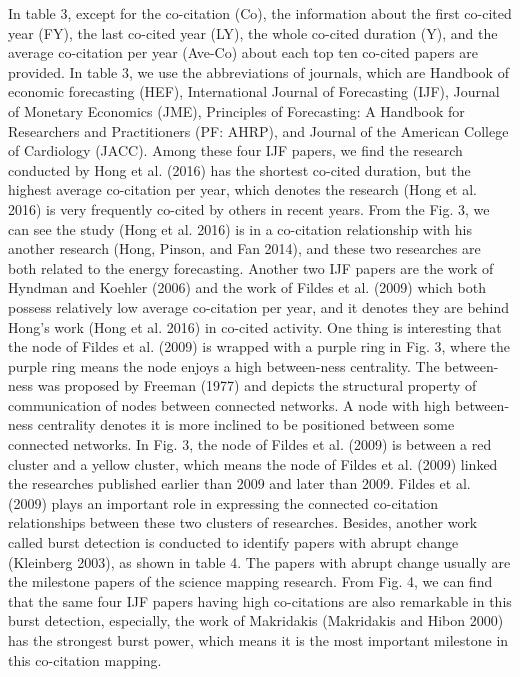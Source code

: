 \documentclass[11pt,a4paper]{elsarticle} %
\begin{document}
In table 3, except for the co-citation (Co), the information about the
first co-cited year (FY), the last co-cited year (LY), the whole
co-cited duration (Y), and the average co-citation per year (Ave-Co)
about each top ten co-cited papers are provided. In table 3, we use the
abbreviations of journals, which are Handbook of economic forecasting
(HEF), International Journal of Forecasting (IJF), Journal of Monetary
Economics (JME), Principles of Forecasting: A Handbook for Researchers
and Practitioners (PF: AHRP), and Journal of the American College of
Cardiology (JACC). Among these four IJF papers, we find the research
conducted by Hong et al. (2016) has the shortest co-cited duration, but
the highest average co-citation per year, which denotes the research
(Hong et al. 2016) is very frequently co-cited by others in recent
years. From the Fig. 3, we can see the study (Hong et al. 2016) is in a
co-citation relationship with his another research (Hong, Pinson, and
Fan 2014), and these two researches are both related to the energy
forecasting. Another two IJF papers are the work of Hyndman and Koehler
(2006) and the work of Fildes et al. (2009) which both possess
relatively low average co-citation per year, and it denotes they are
behind Hong's work (Hong et al. 2016) in co-cited activity. One thing is
interesting that the node of Fildes et al. (2009) is wrapped with a
purple ring in Fig. 3, where the purple ring means the node enjoys a
high between-ness centrality. The between-ness was proposed by Freeman
(1977) and depicts the structural property of communication of nodes
between connected networks. A node with high between-ness centrality
denotes it is more inclined to be positioned between some connected
networks. In Fig. 3, the node of Fildes et al. (2009) is between a red
cluster and a yellow cluster, which means the node of Fildes et al.
(2009) linked the researches published earlier than 2009 and later than
2009. Fildes et al. (2009) plays an important role in expressing the
connected co-citation relationships between these two clusters of
researches. Besides, another work called burst detection is conducted to
identify papers with abrupt change (Kleinberg 2003), as shown in table
4. The papers with abrupt change usually are the milestone papers of the
science mapping research. From Fig. 4, we can find that the same four
IJF papers having high co-citations are also remarkable in this burst
detection, especially, the work of Makridakis (Makridakis and Hibon
2000) has the strongest burst power, which means it is the most
important milestone in this co-citation mapping.
\end{document}
